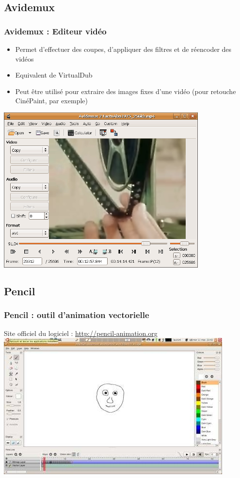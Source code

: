 \subsection{Avidemux}
\begin{frame}
\frametitle{Avidemux : Editeur vidéo}
\begin{itemize}
\item Permet d'effectuer des coupes, d'appliquer des filtres et de réencoder des vidéos
\item Equivalent de VirtualDub
\item Peut être utilisé pour extraire des images fixes d'une vidéo (pour retouche CinéPaint, par exemple)
\end{itemize}
\includegraphics[scale=0.3]{ressources/avidemux.png}

\end{frame}

\subsection{Pencil}
\begin{frame}
\frametitle{Pencil : outil d'animation vectorielle}
Site officiel du logiciel : \href{http://pencil-animation.org/wiki/doku.php?id=en:users:manual:0.4.3b:index}{http://pencil-animation.org}
\includegraphics[scale=0.50]{ressources/pencil.jpg}
\end{frame}

